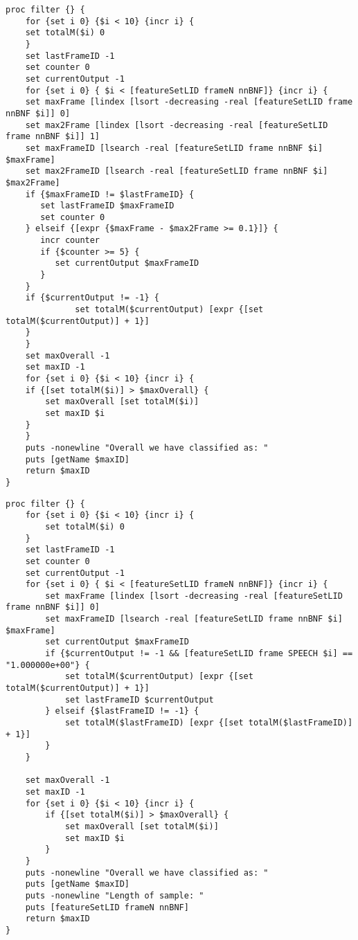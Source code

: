 \begin{lstlisting}[label=lst:DifferenceFilter,caption=Difference Filter employed to smooth/improve output]
proc filter {} {
    for {set i 0} {$i < 10} {incr i} {
    set totalM($i) 0
    }
    set lastFrameID -1
    set counter 0
    set currentOutput -1
    for {set i 0} { $i < [featureSetLID frameN nnBNF]} {incr i} {
    set maxFrame [lindex [lsort -decreasing -real [featureSetLID frame nnBNF $i]] 0]
    set max2Frame [lindex [lsort -decreasing -real [featureSetLID frame nnBNF $i]] 1]
    set maxFrameID [lsearch -real [featureSetLID frame nnBNF $i] $maxFrame]
    set max2FrameID [lsearch -real [featureSetLID frame nnBNF $i] $max2Frame]
    if {$maxFrameID != $lastFrameID} {
       set lastFrameID $maxFrameID
       set counter 0
    } elseif {[expr {$maxFrame - $max2Frame >= 0.1}]} {
       incr counter
       if {$counter >= 5} {
          set currentOutput $maxFrameID
       }
    }
    if {$currentOutput != -1} {
              set totalM($currentOutput) [expr {[set totalM($currentOutput)] + 1}]
    }
    }
    set maxOverall -1
    set maxID -1
    for {set i 0} {$i < 10} {incr i} {
    if {[set totalM($i)] > $maxOverall} {
        set maxOverall [set totalM($i)]
        set maxID $i
    }
    }
    puts -nonewline "Overall we have classified as: "
    puts [getName $maxID]
    return $maxID
}
\end{lstlisting}
\begin{lstlisting}[label=lst:SpeechFilter,caption=Speech Filter employed to smooth/improve output]
proc filter {} {
    for {set i 0} {$i < 10} {incr i} {
        set totalM($i) 0
    }
    set lastFrameID -1
    set counter 0
    set currentOutput -1
    for {set i 0} { $i < [featureSetLID frameN nnBNF]} {incr i} {
        set maxFrame [lindex [lsort -decreasing -real [featureSetLID frame nnBNF $i]] 0]
        set maxFrameID [lsearch -real [featureSetLID frame nnBNF $i] $maxFrame]
        set currentOutput $maxFrameID
        if {$currentOutput != -1 && [featureSetLID frame SPEECH $i] == "1.000000e+00"} {
            set totalM($currentOutput) [expr {[set totalM($currentOutput)] + 1}]
            set lastFrameID $currentOutput
        } elseif {$lastFrameID != -1} {
            set totalM($lastFrameID) [expr {[set totalM($lastFrameID)] + 1}]
        }
    }

    set maxOverall -1
    set maxID -1
    for {set i 0} {$i < 10} {incr i} {
        if {[set totalM($i)] > $maxOverall} {
            set maxOverall [set totalM($i)]
            set maxID $i
        }
    }
    puts -nonewline "Overall we have classified as: "
    puts [getName $maxID]
    puts -nonewline "Length of sample: "
    puts [featureSetLID frameN nnBNF]
    return $maxID
}
\end{lstlisting}



